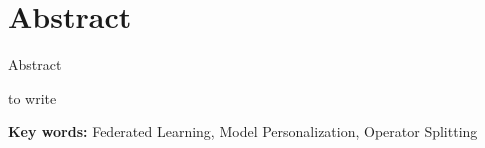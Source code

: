 \chapter*{{Abstract}}%
 \headheight=15.24pt%
 {Abstract}
 \headheight=15.24pt%
\setcounter{page}{2}

to write


\par
\bigskip

{\bf Key words:} Federated Learning, Model Personalization, Operator Splitting

\newpage
~~~\vspace{1em}
\thispagestyle{empty}

